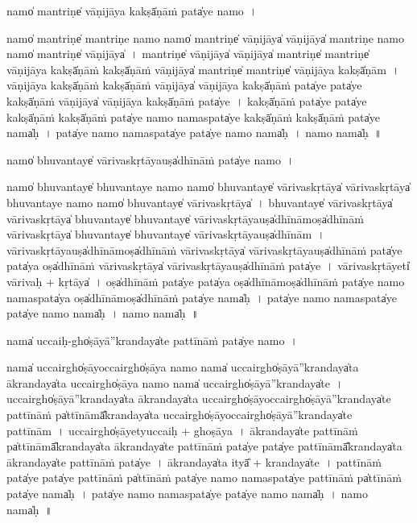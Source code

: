 \documentclass[parskip, DIV=14]{scrartcl}
\begin{document}
{\vspace{0.5cm}
namo̍ ma॒ntriṇe̍ vāṇi॒jāya॒ kakṣā̍ṇā॒ṁ pata̍ye॒ namo॒~।

namo̍ ma॒ntriṇe̍ ma॒ntriṇe॒ namo॒ namo̍ ma॒ntriṇe̍ vāṇi॒jāya̍ vāṇi॒jāya̍ ma॒ntriṇe॒ namo॒ namo̍ ma॒ntriṇe̍ vāṇi॒jāya̍~।
ma॒ntriṇe̍ vāṇi॒jāya̍ vāṇi॒jāya̍ ma॒ntriṇe̍ ma॒ntriṇe̍ vāṇi॒jāya॒ kakṣā̍ṇā॒ṁ kakṣā̍ṇāṁ vāṇi॒jāya̍ ma॒ntriṇe̍ ma॒ntriṇe̍ vāṇi॒jāya॒ kakṣā̍ṇām~।
vā॒ṇi॒jāya॒ kakṣā̍ṇā॒ṁ kakṣā̍ṇāṁ vāṇi॒jāya̍ vāṇi॒jāya॒ kakṣā̍ṇā॒ṁ pata̍ye॒ pata̍ye॒ kakṣā̍ṇāṁ vāṇi॒jāya̍ vāṇi॒jāya॒ kakṣā̍ṇā॒ṁ pata̍ye~।
kakṣā̍ṇā॒ṁ pata̍ye॒ pata̍ye॒ kakṣā̍ṇā॒ṁ kakṣā̍ṇā॒ṁ pata̍ye॒ namo॒ nama॒spata̍ye॒ kakṣā̍ṇā॒ṁ kakṣā̍ṇā॒ṁ pata̍ye॒ nama̍ḥ~।
pata̍ye॒ namo॒ nama॒spata̍ye॒ pata̍ye॒ namo॒ nama̍ḥ~।
namo॒ nama̍ḥ~॥ 

\vspace{0.5cm}
namo̍ bhuva॒ntaye̍ vārivaskṛ॒tāyauṣa̍dhīnā॒ṁ pata̍ye॒ namo॒~।

namo̍ bhuva॒ntaye̍ bhuva॒ntaye॒ namo॒ namo̍ bhuva॒ntaye̍ vārivaskṛ॒tāya̍ vārivaskṛ॒tāya̍ bhuva॒ntaye॒ namo॒ namo̍ bhuva॒ntaye̍ vārivaskṛ॒tāya̍~।
bhu॒va॒ntaye̍ vārivaskṛ॒tāya̍ vārivaskṛ॒tāya̍ bhuva॒ntaye̍ bhuva॒ntaye̍ vārivaskṛ॒tāyauṣa̍dhīnā॒moṣa̍dhīnāṁ vārivaskṛ॒tāya̍ bhuva॒ntaye̍ bhuva॒ntaye̍ vārivaskṛ॒tāyauṣa̍dhīnām~।
vā॒ri॒va॒skṛ॒tāyauṣa̍dhīnā॒moṣa̍dhīnāṁ vārivaskṛ॒tāya̍ vārivaskṛ॒tāyauṣa̍dhīnā॒ṁ pata̍ye॒ pata̍ya॒ oṣa̍dhīnāṁ vārivaskṛ॒tāya̍ vārivaskṛ॒tāyauṣa̍dhīnā॒ṁ pata̍ye~।
vā॒ri॒va॒skṛ॒tāyeti̍ vārivaḥ + kṛ॒tāya̍~।
oṣa̍dhīnā॒ṁ pata̍ye॒ pata̍ya॒ oṣa̍dhīnā॒moṣa̍dhīnā॒ṁ pata̍ye॒ namo॒ nama॒spata̍ya॒ oṣa̍dhīnā॒moṣa̍dhīnā॒ṁ pata̍ye॒ nama̍ḥ~।
pata̍ye॒ namo॒ nama॒spata̍ye॒ pata̍ye॒ namo॒ nama̍ḥ~।
namo॒ nama̍ḥ~॥ 

\vspace{0.5cm}
nama̍ u॒ccaiḥ-gho̍ṣāyā''kra॒ndaya̍te pattī॒nāṁ  pata̍ye॒ namo॒~।

nama̍  u॒ccairgho̍ṣāyo॒ccairgho̍ṣāya॒ namo॒ nama̍ u॒ccairgho̍ṣāyā''kra॒ndaya̍ta ākra॒ndaya̍ta u॒ccairgho̍ṣāya॒ namo॒ nama̍ u॒ccairgho̍ṣāyā''kra॒ndaya̍te~।
u॒ccairgho̍ṣāyā''kra॒ndaya̍ta ākra॒ndaya̍ta u॒ccairgho̍ṣāyo॒ccairgho̍ṣāyā''kra॒ndaya̍te pattī॒nāṁ pa̍ttī॒nāmā̎kra॒ndaya̍ta u॒ccairgho̍ṣāyo॒ccairgho̍ṣāyā''kra॒ndaya̍te pattī॒nām~।
u॒ccairgho̍ṣā॒yetyu॒ccaiḥ + gho॒ṣā॒ya॒~।
ā॒kra॒ndaya̍te pattī॒nāṁ pa̍ttī॒nāmā̎kra॒ndaya̍ta ākra॒ndaya̍te pattī॒nāṁ pata̍ye॒ pata̍ye pattī॒nāmā̎kra॒ndaya̍ta ākra॒ndaya̍te pattī॒nāṁ pata̍ye~।
ā॒kra॒ndaya̍ta॒ ityā̎ + kra॒ndaya̍te~।
pa॒ttī॒nāṁ pata̍ye॒ pata̍ye pattī॒nāṁ pa̍ttī॒nāṁ pata̍ye॒ namo॒ nama॒spata̍ye pattī॒nāṁ pa̍ttī॒nāṁ pata̍ye॒ nama̍ḥ~।
pata̍ye॒ namo॒ nama॒spata̍ye॒ pata̍ye॒ namo॒ nama̍ḥ~।
namo॒ nama̍ḥ~॥ 

}
\end{document}
